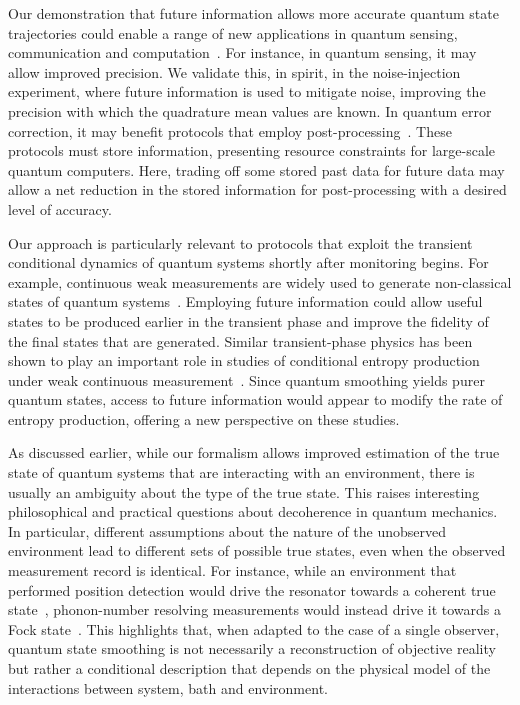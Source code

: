 \documentclass[aps,prx,twocolumn,amsmath,amssymb,superscriptaddress,floatfix,longbibliography
]{revtex4-2}
\begin{document}
Our demonstration that future information allows more accurate quantum state trajectories could enable a range of new applications in quantum sensing, communication and computation~\cite{Duan2025concurrent, Sayrin2011realtime,Magrini2021realtime,convy2022machine,livingston2022experimental}. For instance, in quantum sensing, it may allow improved precision. We validate this, in spirit, in the noise-injection experiment, where future information is used to mitigate noise, improving the precision with which the quadrature mean values are known.
In quantum error correction, it may benefit protocols that employ post-processing~\cite{convy2022machine,livingston2022experimental}. These protocols must store information, presenting resource constraints for large-scale quantum computers. Here, trading off some stored past data for future data may allow a net reduction in the stored information for post-processing with a desired level of accuracy.

Our approach is particularly relevant to protocols that exploit the transient conditional dynamics of quantum systems shortly after monitoring begins. For example, continuous weak measurements are widely used to generate non-classical states of quantum systems~\cite{muller2008entanglement,meng2020mechanical,thomas2021entanglement}. 
Employing future information could allow useful states to be produced earlier in the transient phase and improve the fidelity of the final states that are generated.
Similar transient-phase physics has been shown to play an important role in studies of conditional entropy production under weak continuous measurement~\cite{rossi2020experimental}. Since quantum smoothing yields purer quantum states, access to future information would appear to modify the rate of entropy production, offering a new perspective on these studies. 

As discussed earlier, while our formalism allows improved estimation of the true state of quantum systems that are interacting with an environment, there is usually an ambiguity about the type of the true state. This raises interesting philosophical and practical questions about decoherence in quantum mechanics. In particular, different assumptions about the nature of the unobserved environment lead to different sets of possible true states, even when the observed measurement record is identical. For instance, while an environment that performed position detection would drive the resonator towards a coherent true state~\cite{bowen2015quantum}, phonon-number resolving measurements would instead drive it towards a Fock state~\cite{brawley2016nonlinear,deleglise2008reconstruction}. This highlights that, when adapted to the case of a single observer, quantum state smoothing is not necessarily a reconstruction of objective reality but rather a conditional description that depends on the physical model of the interactions between system, bath and environment.
\end{document}

